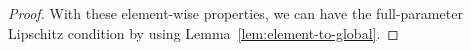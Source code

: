 \begin{proof}
    With these element-wise properties, we can have the full-parameter Lipschitz condition by using Lemma~\ref{lem:element-to-global}.
\end{proof}

